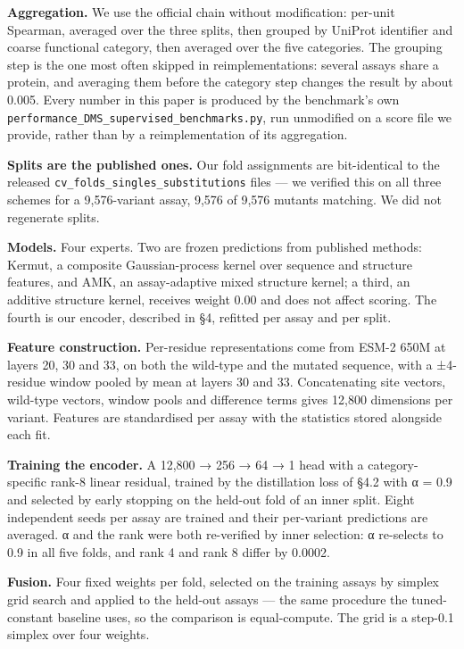 \textbf{Aggregation.} We use the official chain without modification: per-unit Spearman, averaged over the
three splits, then grouped by UniProt identifier and coarse functional category, then averaged over the
five categories. The grouping step is the one most often skipped in reimplementations: several assays
share a protein, and averaging them before the category step changes the result by about 0.005. Every
number in this paper is produced by the benchmark's own
\texttt{performance\_DMS\_supervised\_benchmarks.py}, run unmodified on a score file we provide, rather than by a
reimplementation of its aggregation.

\textbf{Splits are the published ones.} Our fold assignments are bit-identical to the released
\texttt{cv\_folds\_singles\_substitutions} files --- we verified this on all three schemes for a 9,576-variant
assay, 9,576 of 9,576 mutants matching. We did not regenerate splits.

\textbf{Models.} Four experts. Two are frozen predictions from published methods: Kermut, a composite
Gaussian-process kernel over sequence and structure features, and AMK, an assay-adaptive mixed structure
kernel; a third, an additive structure kernel, receives weight 0.00 and does not affect scoring. The
fourth is our encoder, described in §4, refitted per assay and per split.

\textbf{Feature construction.} Per-residue representations come from ESM-2 650M at layers 20, 30 and 33, on
both the wild-type and the mutated sequence, with a ±4-residue window pooled by mean at layers 30 and
33. Concatenating site vectors, wild-type vectors, window pools and difference terms gives 12,800
dimensions per variant. Features are standardised per assay with the statistics stored alongside each
fit.

\textbf{Training the encoder.} A 12,800 → 256 → 64 → 1 head with a category-specific rank-8 linear residual,
trained by the distillation loss of §4.2 with α = 0.9 and selected by early stopping on the held-out
fold of an inner split. Eight independent seeds per assay are trained and their per-variant predictions
are averaged. α and the rank were both re-verified by inner selection: α re-selects to 0.9 in all five
folds, and rank 4 and rank 8 differ by 0.0002.

\textbf{Fusion.} Four fixed weights per fold, selected on the training assays by simplex grid search and
applied to the held-out assays --- the same procedure the tuned-constant baseline uses, so the comparison
is equal-compute. The grid is a step-0.1 simplex over four weights.

